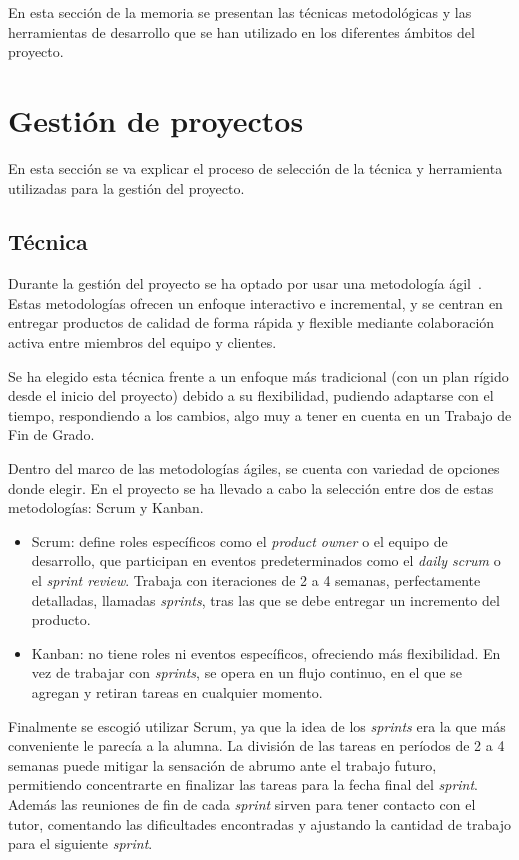 
En esta sección de la memoria se presentan las técnicas metodológicas y las herramientas de desarrollo que se han utilizado en los diferentes ámbitos del proyecto.


\section{Gestión de proyectos}
En esta sección se va explicar el proceso de selección de la técnica y herramienta utilizadas para la gestión del proyecto.

\subsection{Técnica}
Durante la gestión del proyecto se ha optado por usar una metodología ágil~\cite{agil}. Estas metodologías ofrecen un enfoque interactivo e incremental, y se centran en entregar productos de calidad de forma rápida y flexible mediante colaboración activa entre miembros del equipo y clientes.

Se ha elegido esta técnica frente a un enfoque más tradicional (con un plan rígido desde el inicio del proyecto) debido a su flexibilidad, pudiendo adaptarse con el tiempo, respondiendo a los cambios, algo muy a tener en cuenta en un Trabajo de Fin de Grado.

Dentro del marco de las metodologías ágiles, se cuenta con variedad de opciones donde elegir. En el proyecto se ha llevado a cabo la selección entre dos de estas metodologías: Scrum y Kanban.
\begin{itemize}
    \item Scrum: define roles específicos como el \textit{product owner} o el equipo de desarrollo, que participan en eventos predeterminados como el \textit{daily scrum} o el \textit{sprint review}. Trabaja con iteraciones de 2 a 4 semanas, perfectamente detalladas, llamadas \textit{sprints}, tras las que se debe entregar un incremento del producto.
    \item Kanban: no tiene roles ni eventos específicos, ofreciendo más flexibilidad. En vez de trabajar con \textit{sprints}, se opera en un flujo continuo, en el que se agregan y retiran tareas en cualquier momento.
\end{itemize}
Finalmente se escogió utilizar Scrum, ya que la idea de los \textit{sprints} era la que más conveniente le parecía a la alumna. La división de las tareas en períodos de 2 a 4 semanas puede mitigar la sensación de abrumo ante el trabajo futuro, permitiendo concentrarte en finalizar las tareas para la fecha final del \textit{sprint}. Además las reuniones de fin de cada \textit{sprint} sirven para tener contacto con el tutor, comentando las dificultades encontradas y ajustando la cantidad de trabajo para el siguiente \textit{sprint}.


